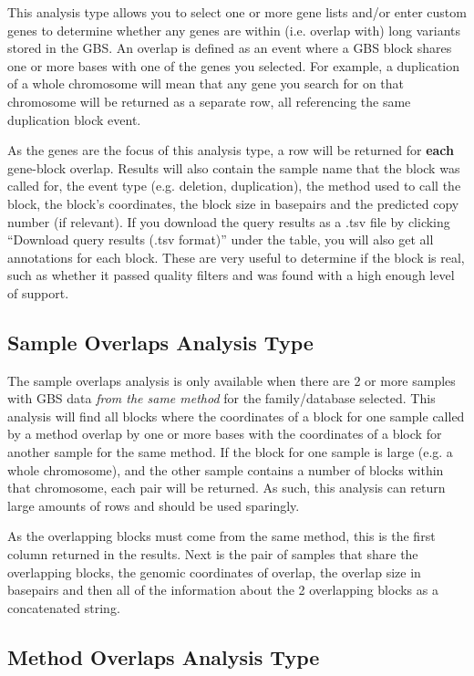 \documentclass[11pt, a4paper]{article}
\begin{document}
This analysis type allows you to select one or more gene lists and/or enter custom genes to determine whether any genes are within (i.e. overlap with) long variants stored in the GBS. An overlap is defined as an event where a GBS block shares one or more bases with one of the genes you selected. For example, a duplication of a whole chromosome will mean that any gene you search for on that chromosome will be returned as a separate row, all referencing the same duplication block event.

As the genes are the focus of this analysis type, a row will be returned for \textbf{each} gene-block overlap. Results will also contain the sample name that the block was called for, the event type (e.g. deletion, duplication), the method used to call the block, the block's coordinates, the block size in basepairs and the predicted copy number (if relevant). If you download the query results as a .tsv file by clicking ``Download query results (.tsv format)'' under the table, you will also get all annotations for each block. These are very useful to determine if the block is real, such as whether it passed quality filters and was found with a high enough level of support. 

\subsection{Sample Overlaps Analysis Type}\label{sampleOverlapsAnalysisType}

The sample overlaps analysis is only available when there are 2 or more samples with GBS data \textit{from the same method} for the family/database selected. This analysis will find all blocks where the coordinates of a block for one sample called by a method overlap by one or more bases with the coordinates of a block for another sample for the same method. If the block for one sample is large (e.g. a whole chromosome), and the other sample contains a number of blocks within that chromosome, each pair will be returned. As such, this analysis can return large amounts of rows and should be used sparingly.

As the overlapping blocks must come from the same method, this is the first column returned in the results. Next is the pair of samples that share the overlapping blocks, the genomic coordinates of overlap, the overlap size in basepairs and then all of the information about the 2 overlapping blocks as a concatenated string.

\subsection{Method Overlaps Analysis Type}
\end{document}
